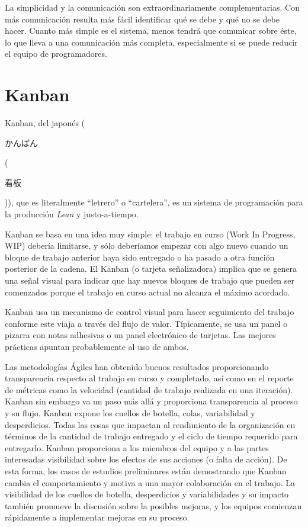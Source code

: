 La simplicidad y la comunicación son extraordinariamente complementarias. Con más comunicación resulta más fácil identificar qué se debe y qué no se debe hacer. Cuanto más simple es el sistema, menos tendrá que comunicar sobre éste, lo que lleva a una comunicación más completa, especialmente si se puede reducir el equipo de programadores.

\section{Kanban}

Kanban, del japonés (\begin{CJK*}{UTF8}{gbsn}かんばん\end{CJK*}(\begin{CJK*}{UTF8}{gbsn}看板\end{CJK*})), que es literalmente ``letrero'' o ``cartelera'', es un sistema de programación para la producción \textit{Lean} y justo-a-tiempo.

Kanban se basa en una idea muy simple: el trabajo en curso (Work In Progress, WIP) debería limitarse, y sólo deberíamos empezar con algo nuevo cuando un bloque de trabajo anterior haya sido entregado o ha pasado a otra función posterior de la cadena. El Kanban (o tarjeta señalizadora) implica que se genera una señal visual para indicar que hay nuevos bloques de trabajo que pueden ser comenzados porque el trabajo en curso actual no alcanza el máximo acordado.

Kanban usa un mecanismo de control visual para hacer seguimiento del trabajo conforme este viaja a través del flujo de valor. Típicamente, se usa un panel o pizarra con notas adhesivas o un panel electrónico de tarjetas. Las mejores prácticas apuntan probablemente al uso de ambos.

Las metodologías Ágiles han obtenido buenos resultados proporcionando transparencia respecto al trabajo en curso y completado, así como en el reporte de métricas como la velocidad (cantidad de trabajo realizada en una iteración). Kanban sin embargo va un paso más allá y proporciona transparencia al proceso y su flujo. Kanban expone los cuellos de botella, colas, variabilidad y desperdicios. Todas las cosas que impactan al rendimiento de la organización en términos de la cantidad de trabajo entregado y el ciclo de tiempo requerido para entregarlo. Kanban proporciona a los miembros del equipo y a las partes interesadas visibilidad sobre los efectos de sus acciones (o falta de acción). De esta forma, los casos de estudios preliminares están demostrando que Kanban cambia el comportamiento y motiva a una mayor colaboración en el trabajo. La visibilidad de los cuellos de botella, desperdicios y variabilidades y su impacto también promueve la discusión sobre la posibles mejoras, y los equipos comienzan rápidamente a implementar mejoras en su proceso.\cite{Skarin201003}

